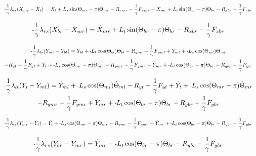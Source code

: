 \documentclass[11pt, landscape]{article}
\newcommand{\mn}{\scalebox{0.7}[1.0]{-}}
\begin{document}
\begin{equation}
\mn\frac{1}{\gamma}\lambda_{rt}(X_{mr} - X_{t }) =
\dot{X}_{t } + L_{s}\sin(\Theta_{mr}-\pi)  \dot{\Theta}_{mr} - R_{xmr} - \frac{1}{\gamma}F_{xmr}
+ \dot{X}_{mr} + L_{t}\sin(\Theta_{br}-\pi)  \dot{\Theta}_{br} - R_{xbr} - \frac{1}{\gamma}F_{xbr}
\end{equation}

\begin{equation}
\mn\frac{1}{\gamma}\lambda_{rs}(X_{br} - X_{mr}) = 
\dot{X}_{mr} + L_{t}\sin(\Theta_{br}-\pi)  \dot{\Theta}_{br} - R_{xbr} - \frac{1}{\gamma}F_{xbr}
\end{equation}


\begin{multline}
\mn\frac{1}{\gamma}\lambda_{ls}(Y_{ml} - Y_{bl}) =
\dot{Y}_{bl} + \mn L_{t}\cos(\Theta_{bl})      \dot{\Theta}_{bl} - R_{yml} - \frac{1}{\gamma}F_{yml} + \dot{Y}_{ml} + \mn L_{s}\cos(\Theta_{ml}) \dot{\Theta}_{ml} \\
- R_{yt} - \frac{1}{\gamma}F_{yt } + \dot{Y}_{t } + \mn L_{s}\cos(\Theta_{mr}-\pi)  \dot{\Theta}_{mr} - R_{ymr} - \frac{1}{\gamma}F_{ymr} + \dot{Y}_{mr}
+ \mn L_{t}\cos(\Theta_{br}-\pi)  \dot{\Theta}_{br} - R_{ybr} - \frac{1}{\gamma}F_{ybr}
\end{multline}


\begin{multline}
\mn\frac{1}{\gamma}\lambda_{lt}(Y_{t } - Y_{ml}) =
\dot{Y}_{ml} + \mn L_{s}\cos(\Theta_{ml})      \dot{\Theta}_{ml} - R_{yt} - \frac{1}{\gamma}F_{yt } + \dot{Y}_{t } + \mn L_{s}\cos(\Theta_{mr}-\pi)  \dot{\Theta}_{mr} \\
- R_{ymr} - \frac{1}{\gamma}F_{ymr} + \dot{Y}_{mr} + \mn L_{t}\cos(\Theta_{br}-\pi)  \dot{\Theta}_{br} - R_{ybr} - \frac{1}{\gamma}F_{ybr}
\end{multline}


\begin{equation}
\mn\frac{1}{\gamma}\lambda_{rt}(Y_{mr} - Y_{t }) =
\dot{Y}_{t } + \mn L_{s}\cos(\Theta_{mr}-\pi)  \dot{\Theta}_{mr} - R_{ymr} - \frac{1}{\gamma}F_{ymr} + \dot{Y}_{mr} + \mn L_{t}\cos(\Theta_{br}-\pi)  \dot{\Theta}_{br}
- R_{ybr} - \frac{1}{\gamma}F_{ybr}
\end{equation}

\begin{equation}
\mn\frac{1}{\gamma}\lambda_{rs}(Y_{br} - Y_{mr}) = \dot{Y}_{mr} + \mn L_{t}\cos(\Theta_{br}-\pi)  \dot{\Theta}_{br} - R_{ybr} - \frac{1}{\gamma}F_{ybr}
\end{equation}
\end{document}
